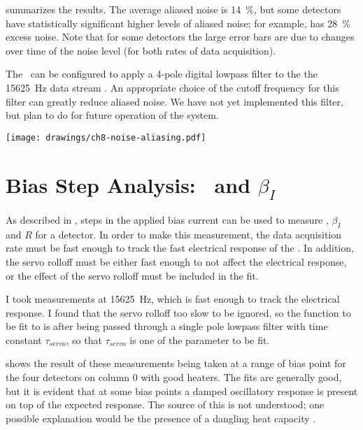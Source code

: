  summarizes the results.
The average aliased noise is \SI{14}{\percent}, but some detectors have statistically significant higher levels of aliased noise; for example,  has \SI{28}{\percent} excess noise.
Note that for some detectors the large error bars are due to changes over time of the noise level (for both rates of data acquisition).

The \MCE\ can be configured to apply a 4-pole digital lowpass filter to the the \SI{15625}{\Hz} data stream \cite{mce_team_digital_????}.
An appropriate choice of the cutoff frequency for this filter can greatly reduce aliased noise.
We have not yet implemented this filter, but plan to do for future operation of the system.

\begin{figure*}
  \centering
\texttt{[image: drawings/ch8-noise-aliasing.pdf]}
\caption{%
\textbf{Top}
Plot showing fractional excess noise (see text for definition) due to noise aliasing for all rows of column 0.
The error bars are for \SI{95}{\percent} confidence intervals, and the average excess noise is \SI{14}{\percent}.
\textbf{Bottom}
Sample power spectra at \SI{3125}{\hertz} and \SI{15625}{\hertz} for .
For this detector the excess noise is \SI{17}{\percent}.
}
\label{fig:ch8-noise-aliasing}
\end{figure*}

\section{Bias Step Analysis: \Loop\ and $\beta_I$} \label{sec:bias-step}

As described in , steps in the applied bias current can be used to measure \Loop, $\beta_I$ and $R$ for a detector.
In order to make this measurement, the data acquisition rate must be fast enough to track the fast electrical response of the \TES.
In addition, the servo rolloff must be either fast enough to not affect the electrical response, or the effect of the servo rolloff must be included in the fit.

I took measurements at \SI{15625}{\hertz}, which is fast enough to track the electrical response.
I found that the servo rolloff too slow to be ignored, so the function to be fit to is  after being passed through a single pole lowpass filter with time constant $\tau_{servo}$, so that $\tau_{servo}$ is one of the parameter to be fit.

 shows the result of these measurements being taken at a range of bias point for the four detectors on column 0 with good heaters.
The fits are generally good, but it is evident that at some bias points a damped oscillatory response is present on top of the expected  response.
The source of this is not understood; one possible explanation would be the presence of a dangling heat capacity \cite{xxx}.

